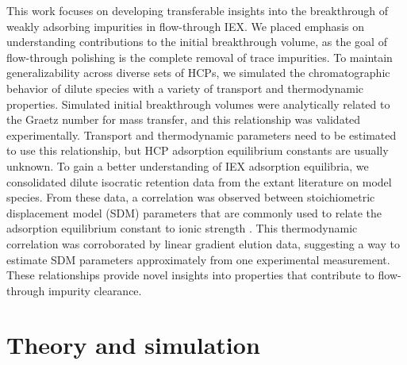 \documentclass[preprint,review,12pt]{elsarticle}
\begin{document}
    This work focuses on developing transferable insights into the breakthrough of weakly adsorbing impurities in flow-through IEX. We placed emphasis on understanding contributions to the initial breakthrough volume, as the goal of flow-through polishing is the complete removal of trace impurities. To maintain generalizability across diverse sets of HCPs, we simulated the chromatographic behavior of dilute species with a variety of transport and thermodynamic properties. Simulated initial breakthrough volumes were analytically related to the Graetz number for mass transfer, and this relationship was validated experimentally. Transport and thermodynamic parameters need to be estimated to use this relationship, but HCP adsorption equilibrium constants are usually unknown. To gain a better understanding of IEX adsorption equilibria, we consolidated dilute isocratic retention data from the extant literature on model species. From these data, a correlation was observed between stoichiometric displacement model (SDM) parameters that are commonly used to relate the adsorption equilibrium constant to ionic strength \cite{Boardman1955}. This thermodynamic correlation was corroborated by linear gradient elution data, suggesting a way to estimate SDM parameters approximately from one experimental measurement. These relationships provide novel insights into properties that contribute to flow-through impurity clearance.


\section{Theory and simulation} \label{sec:sim}
\end{document}
